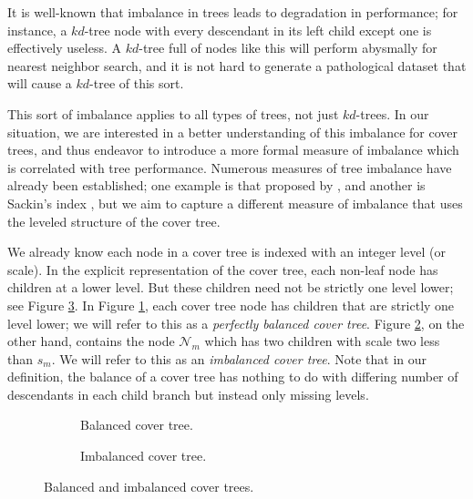 It is well-known that imbalance in trees leads to degradation in performance;
for instance, a $kd$-tree node with every descendant in its left child except
one is effectively useless.  A $kd$-tree full of nodes like this will perform
abysmally for nearest neighbor search, and it is not hard to generate a
pathological dataset that will cause a $kd$-tree of this sort.

This sort of imbalance applies to all types of trees, not just $kd$-trees.  In
our situation, we are interested in a better understanding of this imbalance for
cover trees, and thus endeavor to introduce a more formal measure of imbalance
which is correlated with tree performance.  Numerous measures of tree
imbalance have already been established; one example is that proposed by
\citet{colless1982review}, and another is Sackin's index \citep{sackin1972good},
but we aim to capture a different measure of imbalance that uses the leveled
structure of the cover tree.

We already know each node in a cover tree is indexed with an integer level (or
scale).  In the explicit representation of the cover tree, each non-leaf node
has children at a lower level.  But these children need not be strictly one
level lower; see Figure \ref{fig:imbalance}.  In Figure
\ref{fig:imbalance-good}, each cover tree node has children that are strictly
one level lower; we will refer to this as a {\em perfectly balanced cover tree}.
Figure \ref{fig:imbalance-bad}, on the other hand, contains the node
$\mathscr{N}_m$ which has two children with scale two less than $s_m$.  We will
refer to this as an {\em imbalanced cover tree}.  Note that in our definition,
the balance of a cover tree has nothing to do with differing number of
descendants in each child branch but instead only missing levels.

\begin{figure}[b!]
\begin{subfigure}[b]{0.585\textwidth}
  \begin{center}
    
  \end{center}
  \caption{Balanced cover tree.}
  \label{fig:imbalance-good}
\end{subfigure}
\begin{subfigure}[b]{0.415\textwidth}
  \begin{center}
    
  \end{center}
  \caption{Imbalanced cover tree.}
  \label{fig:imbalance-bad}
\end{subfigure}
\caption{Balanced and imbalanced cover trees.}
\label{fig:imbalance}
\end{figure}

